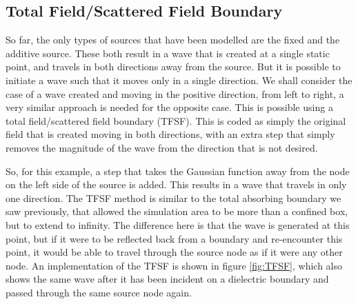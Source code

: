 \subsection{Total Field/Scattered Field Boundary} %
\label{sub:total_field_scattered_field_boundary}
So far, the only types of sources that have been modelled are the fixed and the additive source. These both result in a wave that is created at a single static point, and travels in both directions away from the source. But it is possible to initiate a wave such that it moves only in a single direction. We shall consider the case of a wave created and moving in the positive direction, from left to right, a very similar approach is needed for the opposite case. This is possible using a total field/scattered field boundary (TFSF). This is coded as simply the original field that is created moving in both directions, with an extra step that simply removes the magnitude of the wave from the direction that is not desired. 

So, for this example, a step that takes the Gaussian function away from the node on the left side of the source is added. This results in a wave that travels in only one direction. The TFSF method is similar to the total absorbing boundary we saw previously, that allowed the simulation area to be more than a confined box, but to extend to infinity. The difference here is that the wave is generated at this point, but if it were to be reflected back from a boundary and re-encounter this point, it would be able to travel through the source node as if it were any other node. An implementation  of the TFSF is shown in figure \ref{fig:TFSF}, which also shows the same wave after it has been incident on a dielectric boundary and passed through the same source node again.

